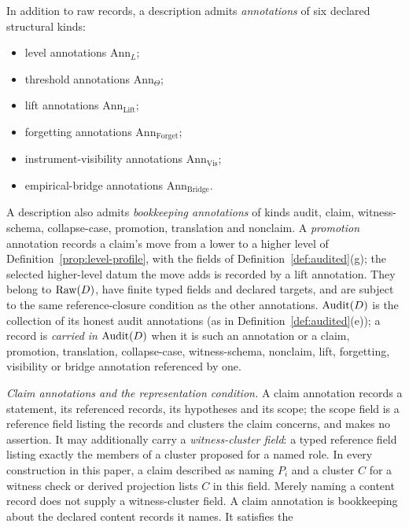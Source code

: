 \begin{definition}[Annotations]\label{def:annotations}
In addition to raw records, a description admits \emph{annotations} of six
declared structural kinds:
\begin{itemize}[topsep=2pt,itemsep=1pt]
  \item level annotations \(\mathrm{Ann}_L\);
  \item threshold annotations \(\mathrm{Ann}_\Theta\);
  \item lift annotations \(\mathrm{Ann}_{\mathrm{Lift}}\);
  \item forgetting annotations \(\mathrm{Ann}_{\mathrm{Forget}}\);
  \item instrument-visibility annotations \(\mathrm{Ann}_{\mathrm{Vis}}\);
  \item empirical-bridge annotations \(\mathrm{Ann}_{\mathrm{Bridge}}\).
\end{itemize}
A description also admits \emph{bookkeeping annotations} of kinds audit,
claim, witness-schema, collapse-case, promotion, translation and nonclaim. A
\emph{promotion} annotation records a claim's move from a lower to a higher
level of Definition~\ref{prop:level-profile}, with the fields of
Definition~\ref{def:audited}(g); the selected higher-level datum the move adds
is recorded by a lift annotation.
They belong to \(\operatorname{Raw}\!\left(D\right)\), have finite typed fields and declared targets,
and are subject to the same reference-closure condition as the other
annotations. \(\operatorname{Audit}\!\left(D\right)\) is the collection of its honest audit
annotations (as in Definition~\ref{def:audited}(e)); a record is \emph{carried in} \(\operatorname{Audit}\!\left(D\right)\) when it is such an
annotation or a claim, promotion, translation, collapse-case,
witness-schema, nonclaim, lift, forgetting, visibility or bridge annotation
referenced by one.
\par\emph{Claim annotations and the representation condition.} A claim annotation records a statement, its referenced
records, its hypotheses and its scope; the scope field is a reference field
listing the records and clusters the claim concerns, and makes no assertion. It may additionally carry a
\emph{witness-cluster field}: a typed reference field listing exactly
the members of a cluster proposed for a named role. In every
construction in this paper, a claim described as naming \(P_i\)
and a cluster \(C\) for a witness check or derived projection
lists \(C\) in this field. Merely naming a content record does
not supply a witness-cluster field. A claim annotation is bookkeeping about
the declared content records it names. It satisfies the

\end{definition}
